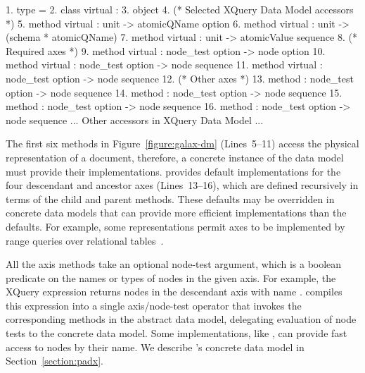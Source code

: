 \begin{figure*}
\begin{small}
\begin{code}
{ 1}. type  = 
{ 2}. class virtual  : 
{ 3}. object
{ 4}.   (* Selected XQuery Data Model accessors *)
{ 5}.   method virtual    : unit -> atomicQName option
{ 6}.   method virtual         : unit -> (schema * atomicQName)
{ 7}.   method virtual  : unit -> atomicValue sequence
\mbox{}
{ 8}.   (* Required axes *)
{ 9}.   method virtual       : node_test option -> node option
{10}.   method virtual        : node_test option -> node sequence
{11}.   method virtual    : node_test option -> node sequence
\mbox{}
{12}.   (* Other axes *)
{13}.   method   : node_test option -> node sequence
{14}.   method           : node_test option -> node sequence
{15}.   method     : node_test option -> node sequence
{16}.   method             : node_test option -> node sequence
\mbox{}
  ... Other accessors in XQuery Data Model ...
\end{code}
\end{small}
\caption{Signatures for methods in Galax's abstract node interface}
\label{figure:galax-dm}
\end{figure*}

The first six methods in Figure~\ref{figure:galax-dm} (Lines~5--11) access the
physical representation of a document, therefore, a concrete instance
of the data model must provide their implementations.  \Galax{}
provides default implementations for the four {descendant} and
ancestor axes (Lines~13--16), which are defined recursively in terms of the {child}
and {parent} methods.  These defaults may be overridden in concrete data
models that can provide more efficient implementations than the
defaults.  For example, some representations permit
axes to be implemented by range queries over relational
tables~\cite{grust03staircase}.

All the axis methods take an optional node-test argument, which is a
boolean predicate on the names or types of nodes in the given axis.
For example, the XQuery expression  returns
nodes in the descendant axis with name .  \Galax{} compiles
this expression into a single axis/node-test operator that invokes the
corresponding methods in the abstract data model, delegating
evaluation of node tests to the concrete data model.  Some
implementations, like \padx{}, can provide fast access to nodes by
their name.  We describe \padx{}'s concrete data model in Section~\ref{section:padx}.

